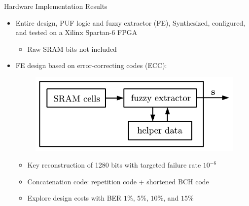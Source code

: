 \begin{frame}{Hardware Implementation Results}
\begin{itemize}
    \item Entire design, PUF logic and fuzzy extractor (FE), Synthesized, configured, and tested on a Xilinx Spartan-6 FPGA 
    \begin{itemize}
        \item Raw SRAM bits not included
    \end{itemize}
    \item  FE design based on error-correcting codes (ECC): 
\begin{figure}
\centering
\includegraphics[width=.5\linewidth]{fig/POK.pdf}
\end{figure}    
    \begin{itemize}
        \item Key reconstruction of 1280 bits with
targeted failure rate $10^{-6}$
        \item Concatenation code: repetition code + shortened BCH code
        \item Explore design costs with BER $1\%$, $5\%$, $10\%$, and $15\%$
    \end{itemize}
\end{itemize}
    
\end{frame}

